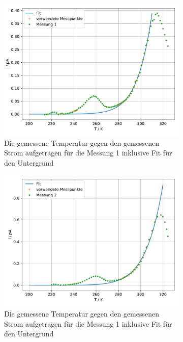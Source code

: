 \begin{figure}
  
  \centering
  \begin{subfigure}[b]{0.75\textwidth}
      \centering
      \includegraphics[width=\textwidth]{build_j/untergrund_1.pdf}
      \caption{Die gemessene Temperatur gegen den gemessenen Strom aufgetragen für die Messung 1 inklusive Fit für den Untergrund}
  \end{subfigure}
  \hfill
  \begin{subfigure}[b]{0.75\textwidth}
      \centering
      \includegraphics[width=\textwidth]{build_j/untergrund_2.pdf}
      \caption{Die gemessene Temperatur gegen den gemessenen Strom aufgetragen für die Messung 1 inklusive Fit für den Untergrund}
  \end{subfigure}
  \caption{}
  \label{fig:Untergrund}
\end{figure}


